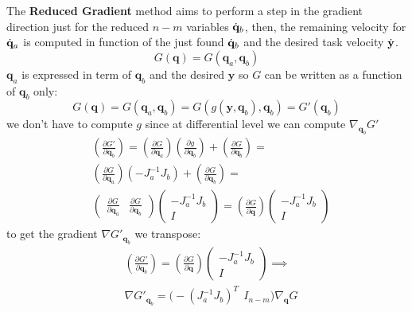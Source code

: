 \documentclass[10pt, a4paper]{report}
\newcommand{\q}{{\mathbf q}}
\begin{document}
The \textbf{Reduced Gradient} method aims to perform a step in the gradient direction just for the reduced $n-m$ variables ${\dot{\mathbf q}}_b$, then, the remaining velocity for ${\dot{\mathbf q}}_a$ is computed in function of the just found ${\dot{\mathbf q}}_b$ and the desired task velocity ${\dot{\mathbf y}}$.
\begin{equation}
    G(\mathbf q)=G(\mathbf q_a,\mathbf q_b)
\end{equation}
$\mathbf q_a$ is expressed in term of $\mathbf q_b$ and the desired $\mathbf y$ so $G$ can be written as a function of $\mathbf q_b$ only:\begin{equation}
    G(\mathbf q)=G(\mathbf q_a,\mathbf q_b)=G(g(\mathbf y,\mathbf q_b),\mathbf q_b)=G'(\mathbf q_b)
\end{equation}
we don't have to compute $g$ since at differential level we can compute $\nabla_{\mathbf q_b}G'$\begin{align}
    &\left(\frac{\partial G'}{\partial \mathbf q_b}\right)=
    \left(\frac{\partial G}{\partial \mathbf q_a}\right)
    \left(\frac{\partial g}{\partial \mathbf q_b}\right)+
    \left(\frac{\partial G}{\partial \mathbf q_b}\right)=\\[1.5ex]
    &\left(\frac{\partial G}{\partial \mathbf q_a}\right)(-J_a^{-1}J_b)+
    \left(\frac{\partial G}{\partial \mathbf q_b}\right)=\\[1.5ex] 
    &\begin{pmatrix}\displaystyle
        \frac{\partial G}{\partial \mathbf q_a}&\displaystyle\frac{\partial G}{\partial \mathbf q_b}
    \end{pmatrix}\begin{pmatrix}
        -J_a^{-1}J_b\\ I
    \end{pmatrix}=\left(\frac{\partial G}{\partial \mathbf q}\right)\begin{pmatrix}
        -J_a^{-1}J_b\\ I
\end{pmatrix}\end{align}
    to get the gradient $\nabla G'_{\q_b}$ we transpose:
\begin{align}
    &\left(\frac{\partial G'}{\partial \mathbf q_b}\right)=\left(\frac{\partial G}{\partial \mathbf q}\right)\begin{pmatrix}
        -J_a^{-1}J_b\\ I
\end{pmatrix}\implies\\[1.5ex]
    &\nabla G'_{\q_b}=\Big(
        -(J_a^{-1}J_b)^T \ \ I_{n-m}
   \Big)\nabla_{\mathbf q}G
\end{align}
\end{document}
